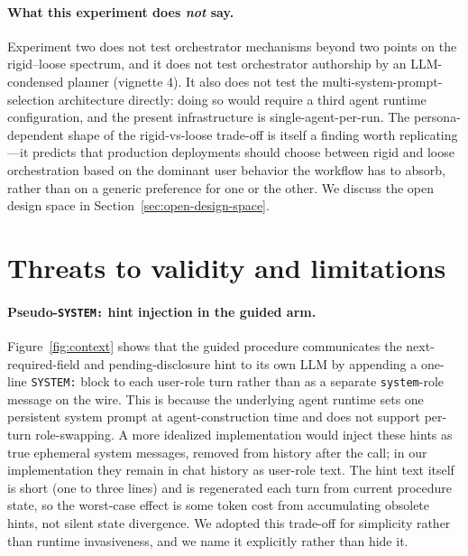\documentclass[11pt,a4paper]{article}
\begin{document}
\paragraph{What this experiment does \emph{not} say.}
Experiment two does not test orchestrator mechanisms beyond two points on the rigid--loose spectrum, and it does not test orchestrator authorship by an LLM-condensed planner (vignette 4). It also does not test the multi-system-prompt-selection architecture directly: doing so would require a third agent runtime configuration, and the present infrastructure is single-agent-per-run. The persona-dependent shape of the rigid-vs-loose trade-off is itself a finding worth replicating---it predicts that production deployments should choose between rigid and loose orchestration based on the dominant user behavior the workflow has to absorb, rather than on a generic preference for one or the other. We discuss the open design space in Section~\ref{sec:open-design-space}.

\section{Threats to validity and limitations}
\label{sec:limits}

\paragraph{Pseudo-\texttt{SYSTEM:} hint injection in the guided arm.}
Figure~\ref{fig:context} shows that the guided procedure communicates the next-required-field and pending-disclosure hint to its own LLM by appending a one-line \texttt{SYSTEM:} block to each user-role turn rather than as a separate \texttt{system}-role message on the wire. This is because the underlying agent runtime sets one persistent system prompt at agent-construction time and does not support per-turn role-swapping. A more idealized implementation would inject these hints as true ephemeral system messages, removed from history after the call; in our implementation they remain in chat history as user-role text. The hint text itself is short (one to three lines) and is regenerated each turn from current procedure state, so the worst-case effect is some token cost from accumulating obsolete hints, not silent state divergence. We adopted this trade-off for simplicity rather than runtime invasiveness, and we name it explicitly rather than hide it.
\end{document}
